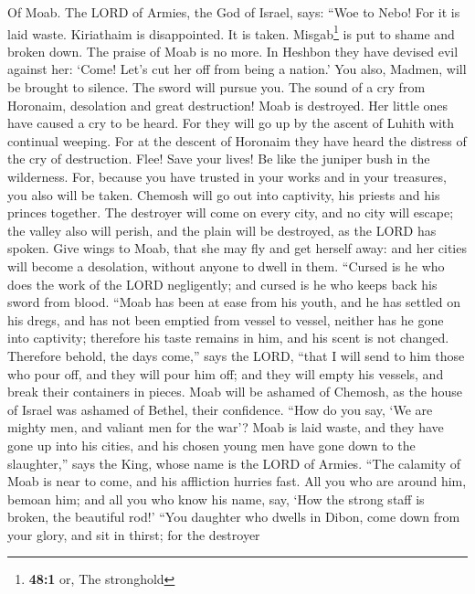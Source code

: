  Of Moab. The LORD of Armies, the God of Israel, says:
``Woe to Nebo! For it is laid waste. Kiriathaim is disappointed. It is
taken. Misgab\footnote{\textbf{48:1} or, The stronghold} is put to shame
and broken down.  The praise of Moab is no more. In
Heshbon they have devised evil against her: `Come! Let's cut her off
from being a nation.' You also, Madmen, will be brought to silence. The
sword will pursue you.  The sound of a cry from Horonaim,
desolation and great destruction!  Moab is destroyed. Her
little ones have caused a cry to be heard.  For they will
go up by the ascent of Luhith with continual weeping. For at the descent
of Horonaim they have heard the distress of the cry of destruction.
 Flee! Save your lives! Be like the juniper bush in the
wilderness.  For, because you have trusted in your works
and in your treasures, you also will be taken. Chemosh will go out into
captivity, his priests and his princes together.  The
destroyer will come on every city, and no city will escape; the valley
also will perish, and the plain will be destroyed, as the LORD has
spoken.  Give wings to Moab, that she may fly and get
herself away: and her cities will become a desolation, without anyone to
dwell in them.  ``Cursed is he who does the work of the
LORD negligently; and cursed is he who keeps back his sword from blood.
 ``Moab has been at ease from his youth, and he has
settled on his dregs, and has not been emptied from vessel to vessel,
neither has he gone into captivity; therefore his taste remains in him,
and his scent is not changed.  Therefore behold, the days
come,'' says the LORD, ``that I will send to him those who pour off, and
they will pour him off; and they will empty his vessels, and break their
containers in pieces.  Moab will be ashamed of Chemosh,
as the house of Israel was ashamed of Bethel, their confidence.
 ``How do you say, `We are mighty men, and valiant men
for the war'?  Moab is laid waste, and they have gone up
into his cities, and his chosen young men have gone down to the
slaughter,'' says the King, whose name is the LORD of Armies.
 ``The calamity of Moab is near to come, and his
affliction hurries fast.  All you who are around him,
bemoan him; and all you who know his name, say, `How the strong staff is
broken, the beautiful rod!'  ``You daughter who dwells in
Dibon, come down from your glory, and sit in thirst; for the destroyer
